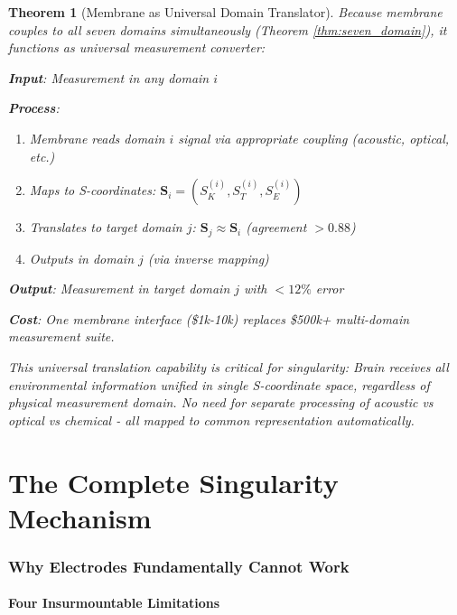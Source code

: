 \documentclass[11pt,a4paper]{article}
\newtheorem{theorem}{Theorem}[section]
\theoremstyle{definition}
\theoremstyle{remark}
\begin{document}
\begin{theorem}[Membrane as Universal Domain Translator]
Because membrane couples to all seven domains simultaneously (Theorem \ref{thm:seven_domain}), it functions as universal measurement converter:

\textbf{Input}: Measurement in any domain $i$

\textbf{Process}:
\begin{enumerate}
\item Membrane reads domain $i$ signal via appropriate coupling (acoustic, optical, etc.)
\item Maps to S-coordinates: $\mathbf{S}_i = (S_K^{(i)}, S_T^{(i)}, S_E^{(i)})$
\item Translates to target domain $j$: $\mathbf{S}_j \approx \mathbf{S}_i$ (agreement $>0.88$)
\item Outputs in domain $j$ (via inverse mapping)
\end{enumerate}

\textbf{Output}: Measurement in target domain $j$ with $<12\%$ error

\textbf{Cost}: One membrane interface (\$1k-10k) replaces \$500k+ multi-domain measurement suite.

This universal translation capability is critical for singularity: Brain receives all environmental information unified in single S-coordinate space, regardless of physical measurement domain. No need for separate processing of acoustic vs optical vs chemical - all mapped to common representation automatically.
\end{theorem}

\part{The Complete Singularity Mechanism}

\section{Why Electrodes Fundamentally Cannot Work}

\subsection{Four Insurmountable Limitations}
\end{document}
